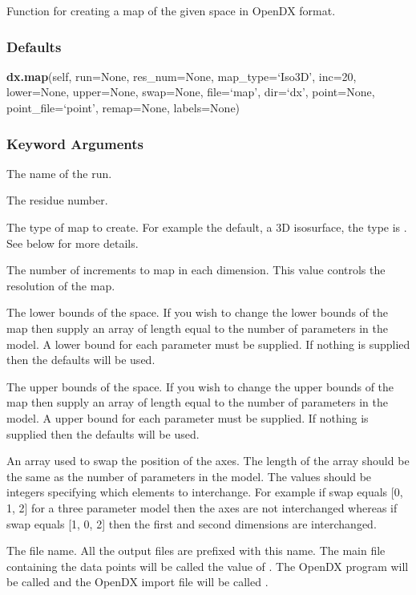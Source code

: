 Function for creating a map of the given space in OpenDX format.

\subsubsection{Defaults}

\textsf{\textbf{dx.map}(self, run=None, res\_num=None, map\_type=`Iso3D', inc=20, lower=None, upper=None, swap=None, file=`map', dir=`dx', point=None, point\_file=`point', remap=None, labels=None)}


\subsubsection{Keyword Arguments}


  The name of the run.

  The residue number.

  The type of map to create.  For example the default, a 3D isosurface, the type is 
.  See below for more details.

  The number of increments to map in each dimension.  This value controls the resolution of the map.

  The lower bounds of the space.  If you wish to change the lower bounds of the map then supply an array of length equal to the number of parameters in the model.  A lower bound for each parameter must be supplied.  If nothing is supplied then the defaults will be used.

  The upper bounds of the space.  If you wish to change the upper bounds of the map then supply an array of length equal to the number of parameters in the model.  A upper bound for each parameter must be supplied.  If nothing is supplied then the defaults will be used.

  An array used to swap the position of the axes.  The length of the array should be the same as the number of parameters in the model.  The values should be integers specifying which elements to interchange.  For example if swap equals [0, 1, 2] for a three parameter model then the axes are not interchanged whereas if swap equals [1, 0, 2] then the first and second dimensions are interchanged.

  The file name.  All the output files are prefixed with this name.  The main file containing the data points will be called the value of 
.  The OpenDX program will be called 
 and the OpenDX import file will be called 
.

